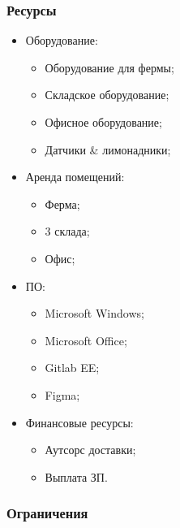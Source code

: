 \documentclass[a4paper,10pt]{article}
\begin{document}
\subsubsection{Ресурсы}
    \begin{itemize}
        \item Оборудование:
            \begin{itemize}
                \item Оборудование для фермы;
                \item Складское оборудование;
                \item Офисное оборудование;
                \item Датчики \& лимонадники;
            \end{itemize}

        \item Аренда помещений:
            \begin{itemize}
                \item Ферма;
                \item 3 склада;
                \item Офис;
            \end{itemize}

        \item ПО:
            \begin{itemize}
                \item Microsoft Windows;
                \item Microsoft Office;
                \item Gitlab EE;
                \item Figma;
            \end{itemize}

        \item Финансовые ресурсы:
            \begin{itemize}
                \item Аутсорс доставки;
                \item Выплата ЗП.
            \end{itemize}

    \end{itemize}


\subsubsection{Ограничения}
\end{document}
